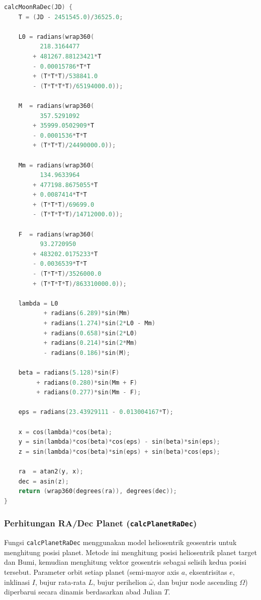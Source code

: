 \begin{lstlisting}[caption={Pseudocode Perhitungan RA/Dec Bulan (calcMoonRaDec, aproksimasi)}, label={code:4.pseudocode_moon_radec}, language=C]
calcMoonRaDec(JD) {
    T = (JD - 2451545.0)/36525.0;

    L0 = radians(wrap360(
          218.3164477
        + 481267.88123421*T
        - 0.00015786*T*T
        + (T*T*T)/538841.0
        - (T*T*T*T)/65194000.0));

    M  = radians(wrap360(
          357.5291092
        + 35999.0502909*T
        - 0.0001536*T*T
        + (T*T*T)/24490000.0));

    Mm = radians(wrap360(
          134.9633964
        + 477198.8675055*T
        + 0.0087414*T*T
        + (T*T*T)/69699.0
        - (T*T*T*T)/14712000.0));

    F  = radians(wrap360(
          93.2720950
        + 483202.0175233*T
        - 0.0036539*T*T
        - (T*T*T)/3526000.0
        + (T*T*T*T)/863310000.0));

    lambda = L0
           + radians(6.289)*sin(Mm)
           + radians(1.274)*sin(2*L0 - Mm)
           + radians(0.658)*sin(2*L0)
           + radians(0.214)*sin(2*Mm)
           - radians(0.186)*sin(M);

    beta = radians(5.128)*sin(F)
         + radians(0.280)*sin(Mm + F)
         + radians(0.277)*sin(Mm - F);

    eps = radians(23.43929111 - 0.013004167*T);

    x = cos(lambda)*cos(beta);
    y = sin(lambda)*cos(beta)*cos(eps) - sin(beta)*sin(eps);
    z = sin(lambda)*cos(beta)*sin(eps) + sin(beta)*cos(eps);

    ra  = atan2(y, x);
    dec = asin(z);
    return (wrap360(degrees(ra)), degrees(dec));
}
\end{lstlisting}

\subsubsection{Perhitungan RA/Dec Planet (\texttt{calcPlanetRaDec})} \label{IV.Software.PlanetRaDec}
Fungsi \texttt{calcPlanetRaDec} menggunakan model heliosentrik geosentris untuk menghitung posisi planet. Metode ini menghitung posisi heliosentrik planet target dan Bumi, kemudian menghitung vektor geosentris sebagai selisih kedua posisi tersebut. Parameter orbit setiap planet (semi-mayor axis $a$, eksentrisitas $e$, inklinasi $I$, bujur rata-rata $L$, bujur perihelion $\bar{\omega}$, dan bujur node ascending $\Omega$) diperbarui secara dinamis berdasarkan abad Julian $T$. \par

